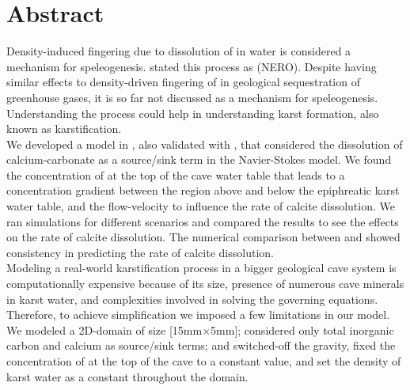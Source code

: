\chapter*{Abstract}
\thispagestyle{empty}
Density-induced fingering due to dissolution of  in water is considered a mechanism for 
speleogenesis. \citet{Scherzer2017} stated this process as  (NERO). 
Despite having similar effects to density-driven fingering of  in geological sequestration 
of greenhouse gases, it is so far not discussed as a mechanism for speleogenesis. Understanding the 
process could help in understanding karst formation, also known as karstification.\\

We developed a model in \DuMuX, also validated with \MATLAB, that considered the dissolution of calcium-carbonate 
as a source/sink term in the Navier-Stokes model. We found the concentration of  at the top of 
the cave water table that leads to a concentration gradient between the region above and below the epiphreatic karst water table, 
and the flow-velocity to influence the rate of calcite dissolution. We ran simulations for different 
scenarios and compared the results to see the effects on the rate of calcite dissolution. The numerical comparison 
between \DuMuX and \MATLAB showed consistency in predicting the rate of calcite dissolution. \\

Modeling a real-world karstification process in a bigger geological cave system is computationally expensive 
because of its size, presence of numerous cave minerals in karst water, and complexities involved in 
solving the governing equations. Therefore, to achieve simplification we imposed a few limitations in our model. 
We modeled a 2D-domain of size [15mm$\times$5mm]; considered only total inorganic carbon and calcium as source/sink terms; and 
switched-off the gravity, fixed the concentration of  at the top of the cave to a constant value, and 
set the density of karst water as a constant throughout the domain. \\

\endinput